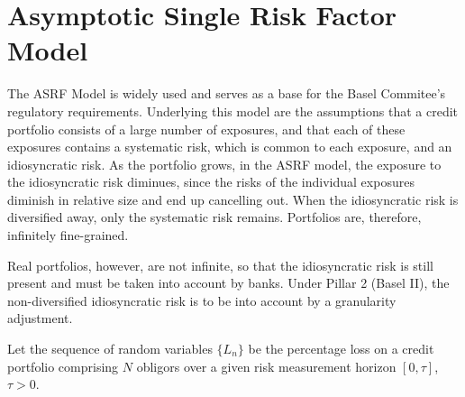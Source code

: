\section{Asymptotic Single Risk Factor Model}

The ASRF Model is widely used and serves as a base for the Basel Commitee's regulatory requirements.
Underlying this model are the assumptions that a credit portfolio consists of a large number of exposures, and that each of these exposures contains a systematic risk, which is common to each exposure, and an idiosyncratic risk.
As the portfolio grows, in the ASRF model, the exposure to the idiosyncratic risk diminues, since the risks of the individual exposures diminish in relative size and end up cancelling out.
When the idiosyncratic risk is diversified away, only the systematic risk remains.
Portfolios are, therefore, infinitely fine-grained.

Real portfolios, however, are not infinite, so that the idiosyncratic risk is still present and must be taken into account by banks.
Under Pillar 2 (Basel II), the non-diversified idiosyncratic risk is to be into account by a granularity adjustment.

Let the sequence of random variables $\{L_n\}$ be the percentage loss on a credit portfolio comprising $N$ obligors over a given risk measurement horizon $[0, \tau]$, $\tau > 0$.
